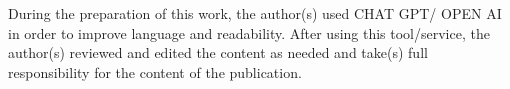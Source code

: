 
During the preparation of this work, the author(s) used CHAT GPT/ OPEN AI in order to improve language and readability.
After using this tool/service, the author(s) reviewed and edited the content as needed and take(s) full responsibility for the content of the publication.